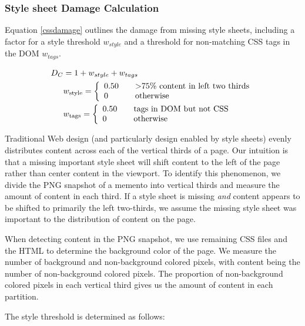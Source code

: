 \subsubsection{Style sheet Damage Calculation}
Equation \ref{cssdamage} outlines the damage from missing style sheets, including a factor for a style threshold $w_{style}$ and a threshold for non-matching CSS tags in the DOM $w_{tags}$. 


\begin{equation}
\label{cssdamage}
\begin{split}
D_C &= 1 + w_{style} + w_{tags}\\
&w_{\text{style}} =  \left\{
  \begin{array}{l l}
    0.50 & \quad \text{\textgreater 75\% content in left two thirds}\\
    0    & \quad \text{otherwise}
  \end{array} \right.\\
&w_{\text{tags}} =  \left\{
  \begin{array}{l l}
    0.50 & \quad \text{tags in DOM but not CSS}\\
    0    & \quad \text{otherwise}
  \end{array} \right.
\end{split}
\end{equation}


Traditional Web design (and particularly design enabled by style sheets) evenly distributes content across each of the vertical thirds of a page. Our intuition is that a missing important style sheet will shift content to the left of the page rather than center content in the viewport. To identify this phenomenon, we divide the PNG snapshot of a memento into vertical thirds and measure the amount of content in each third. If a style sheet is missing \emph{and} content appears to be shifted to primarily the left two-thirds, we assume the missing style sheet was important to the distribution of content on the page.

When detecting content in the PNG snapshot, we use remaining CSS files and the HTML to determine the background color of the page. We measure the number of background and non-background colored pixels, with content being the number of non-background colored pixels. The proportion of non-background colored pixels in each vertical third gives us the amount of content in each partition.

The style threshold is determined as follows:

